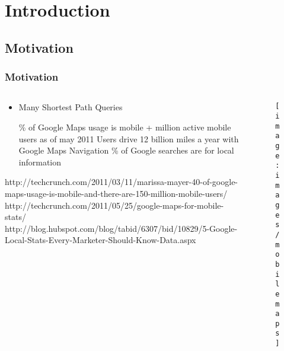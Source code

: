 
\section{Introduction} %


\subsection{Motivation}
\begin{frame}[red] %
\frametitle{Motivation} 
\begin{columns}
  \begin{column}{0.5\textwidth}
    \begin{itemize} \vspace{-1.5em}
      \item Many Shortest Path Queries
      \begin{itemize} 
       \% of Google Maps usage is mobile %
      + million active mobile users as of may 2011
      \gitem Users drive 12 billion miles a year with Google Maps Navigation
       \% of Google searches are for local information 
      \end{itemize}
    \end{itemize}
  {
      \tiny \color{lightgray}
       http://techcrunch.com/2011/03/11/marissa-mayer-40-of-google-maps-usage-is-mobile-and-there-are-150-million-mobile-users/ \\
       http://techcrunch.com/2011/05/25/google-maps-for-mobile-stats/ \\
       http://blog.hubspot.com/blog/tabid/6307/bid/10829/5-Google-Local-Stats-Every-Marketer-Should-Know-Data.aspx \\
  }
  \end{column}
  \begin{column}[t]{0.5\textwidth}
  \vspace{-2em}
    \begin{figure}
    \texttt{[image: images/mobilemaps]} 
    \end{figure}
  \end{column}
\end{columns}
\end{frame}

